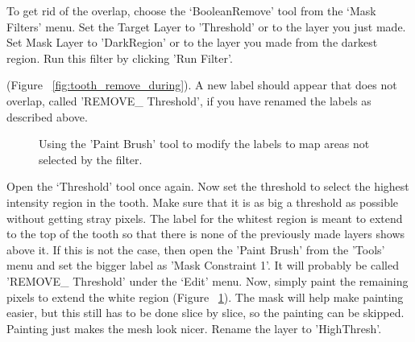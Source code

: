 \documentclass[fleqn,12pt,openany]{book}
\begin{document}
To get rid of the overlap, choose the `BooleanRemove'
tool from the `Mask Filters' menu. Set the Target Layer to 'Threshold' or to the layer you just made. Set Mask Layer to 'DarkRegion' or to the layer you made from the darkest region. Run this filter by clicking 'Run Filter'.

(Figure ~\ref{fig:tooth_remove_during}). A new label should appear that does
not overlap, called 'REMOVE\_ Threshold', if you have renamed the labels as described above.  

\begin{figure}
\caption{\label{fig:tooth_paint} Using the 'Paint Brush' tool to modify the labels to map areas not selected by the filter.}
\end{figure} 

Open the `Threshold' tool once again. Now set the threshold to select the 
highest intensity  region in the tooth. Make sure that it is as big a 
threshold as possible without getting stray pixels. The label for the whitest 
region is meant to extend to the top of the tooth so that there is none of the 
previously made layers shows above it. If this is not the case, then open the 'Paint Brush'
from the 'Tools' menu and set the 
bigger label as 'Mask Constraint 1'. It will probably be called 'REMOVE\_ Threshold'
under the `Edit' menu. Now, simply paint the remaining pixels to extend the white region 
(Figure ~\ref{fig:tooth_paint}). The mask will help make painting easier, 
but this still has to be done slice by slice, so the painting can be skipped.  
Painting just makes the mesh look nicer. Rename the layer to 'HighThresh'.
\end{document}
